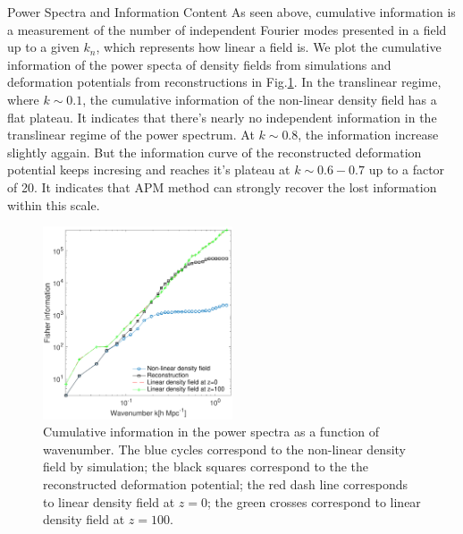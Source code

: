 \begin{section}{Power Spectra and Information Content}
As seen above, cumulative information is a measurement of the number of independent Fourier modes presented in a field up to a given $k_n$, which represents how linear a field is. We plot the cumulative information of the power specta of density fields from simulations and deformation potentials from reconstructions in Fig.\ref{fig:fisherinfo}. In the translinear regime, where $k\sim0.1$, the cumulative information of the non-linear density field has a flat plateau. It indicates that there's nearly no independent information in the translinear regime of the power spectrum. At $k\sim0.8$, the information increase slightly aggain. But the information curve of the reconstructed deformation potential keeps incresing and reaches it's plateau at $k\sim0.6-0.7$ up to a factor of 20. It indicates that APM method can strongly recover the lost information within this scale. 
\begin{figure}[htbp]
 \begin{center}
  \includegraphics[width=0.5\textwidth]{fishernew-crop.pdf}
   \caption{Cumulative information in the power spectra as a function of wavenumber. The blue cycles correspond to the non-linear density field by simulation; the black squares correspond to the the reconstructed deformation potential; the red dash line corresponds to linear density field at $z=0$; the green crosses correspond to linear density field at $z=100$.}
  \label{fig:fisherinfo}
 \end{center}
\end{figure}


\end{section}
